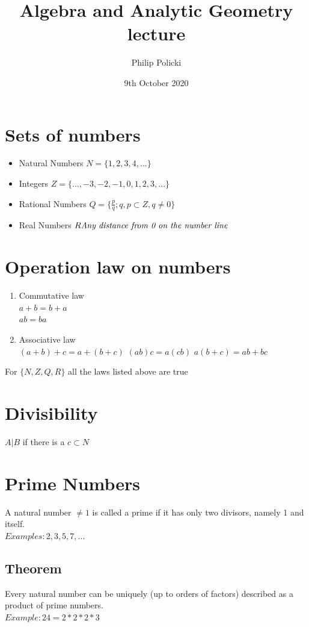 \documentclass{article}
\title{ Algebra and Analytic Geometry lecture }
\author{Philip Policki}
\date{9th October 2020}
\begin{document}
\graphicspath{{./imgs/}}
\maketitle
\tableofcontents
\pagebreak
\large
\section{Sets of numbers}
	\begin{itemize}
		\item Natural Numbers $N = \{1, 2, 3, 4, ...\}$
		\item Integers $Z = \{ ..., -3, -2, -1, 0, 1, 2, 3, ... \}$
		\item Rational Numbers $Q = \{  \frac{p}{q}; q,p \subset Z, q \neq 0  \}$
		\item Real Numbers $R \emph{Any distance from 0 on the number line}$
	\end{itemize}

\section{Operation law on numbers}

	\begin{enumerate}
	\item Commutative law \\ 
	$ a + b = b + a$ \\
	$ ab = ba $ 
	\item Associative law \\ 
	$ (a + b) + c = a + (b + c) $
	$ (ab)c = a(cb)$
	$ a(b+ c) = ab + bc $ 
	\end{enumerate}
For $\{N, Z, Q, R\}$ all the laws listed above are true 
\section{Divisibility}
	$A|B$  if there is a $c \subset N $
	
\section{Prime Numbers}
	A natural number $\neq 1$ is called a prime if it has only two divisors, namely 1 and itself. \\
	$Examples: 2, 3, 5, 7, ...$
	
	\subsection{Theorem}
	Every natural number can be uniquely (up to orders of factors) described as a product of prime numbers.\\
	$ Example: 24 = 2*2*2*3$
\end{document}
